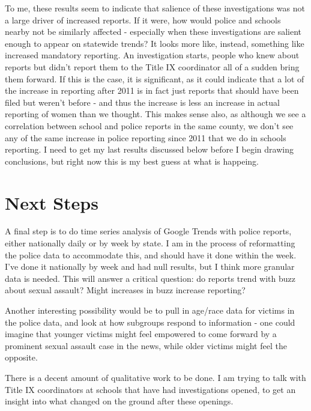 \documentclass[AER,draftmode]{AEA}
\begin{document}
To me, these results seem to indicate that salience of these investigations was not a large driver of increased reports. If it were, how would police and schools nearby not be similarly affected - especially when these investigations are salient enough to appear on statewide trends? It looks more like, instead, something like increased mandatory reporting. An investigation starts, people who knew about reports but didn't report them to the Title IX coordinator all of a sudden bring them forward. If this is the case, it is significant, as it could indicate that a lot of the increase in reporting after 2011 is in fact just reports that should have been filed but weren't before - and thus the increase is less an increase in actual reporting of women than we thought. This makes sense also, as although we see a correlation between school and police reports in the same county, we don't see any of the same increase in police reporting since 2011 that we do in schools reporting.  I need to get my last results discussed below before I begin drawing conclusions, but right now this is my best guess at what is happeing. 

\section{Next Steps}

A final step is to do time series analysis of Google Trends with police reports, either nationally daily or by week by state. I am in the process of reformatting the police data to accommodate this, and should have it done within the week. I've done it nationally by week and had null results, but I think more granular data is needed. This will answer a critical question: do reports trend with buzz about sexual assault? Might increases in buzz increase reporting?

Another interesting possibility would be to pull in age/race data for victims in the police data, and look at how subgroups respond to information - one could imagine that younger victims might feel empowered to come forward by a prominent sexual assault case in the news, while older victims might feel the opposite.

There is a decent amount of qualitative work to be done. I am trying to talk with Title IX coordinators at schools that have had investigations opened, to get an insight into what changed on the ground after these openings.

\clearpage
\end{document}
